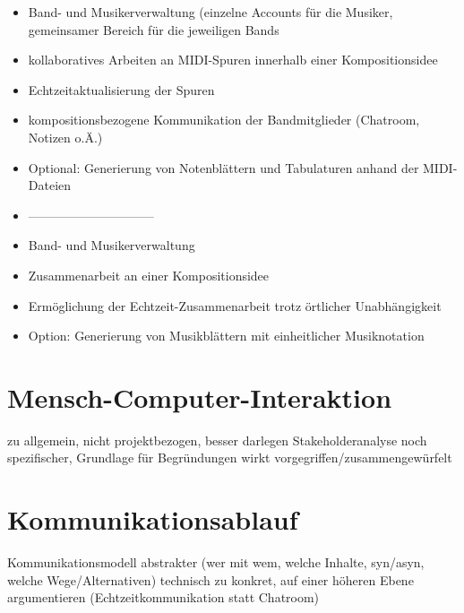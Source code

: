 \documentclass[12pt]{scrartcl}
\begin{document}
\begin{itemize}
\item Band- und Musikerverwaltung (einzelne Accounts für die Musiker, gemeinsamer Bereich für die jeweiligen Bands
\item kollaboratives Arbeiten an MIDI-Spuren innerhalb einer Kompositionsidee
\item Echtzeitaktualisierung der Spuren
\item kompositionsbezogene Kommunikation der Bandmitglieder (Chatroom, Notizen o.Ä.)
\item Optional: Generierung von Notenblättern und Tabulaturen anhand der MIDI-Dateien
\item ------------------------------
\item Band- und Musikerverwaltung
\item Zusammenarbeit an einer Kompositionsidee 
\item Ermöglichung der Echtzeit-Zusammenarbeit trotz örtlicher Unabhängigkeit
\item Option: Generierung von Musikblättern mit einheitlicher Musiknotation
\end{itemize}









\section{Mensch-Computer-Interaktion}

zu allgemein, nicht projektbezogen, besser darlegen
Stakeholderanalyse noch spezifischer, Grundlage für Begründungen
wirkt vorgegriffen/zusammengewürfelt


\section{Kommunikationsablauf}

Kommunikationsmodell abstrakter (wer mit wem, welche Inhalte, syn/asyn, welche Wege/Alternativen)
technisch zu konkret, auf einer höheren Ebene argumentieren (Echtzeitkommunikation statt Chatroom)
\end{document}
